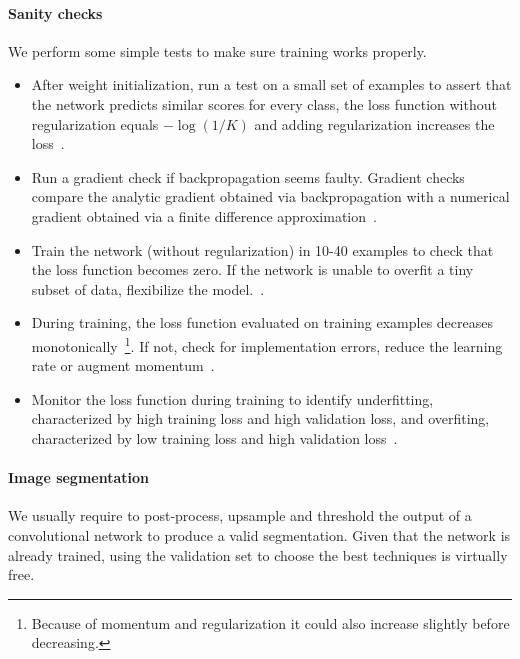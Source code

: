 \paragraph{Sanity checks}
We perform some simple tests to make sure training works properly.
\begin{itemize}
	\item After weight initialization, run a test on a small set of examples to assert that the network predicts similar scores for every class, the loss function without regularization equals $-\log(1/K)$ and adding regularization increases the loss~\cite{Karpathy2015}.

	\item Run a gradient check if backpropagation seems faulty. Gradient checks compare the analytic gradient obtained via backpropagation with a numerical gradient obtained via a finite difference approximation~\cite{Karpathy2015}.

	\item Train the network (without regularization) in 10-40 examples to check that the loss function becomes zero. If the network is unable to overfit a tiny subset of data, flexibilize the model.~\cite{Ng2014}.

	\item During training, the loss function evaluated on training examples decreases monotonically~\footnote{Because of momentum and regularization it could also increase slightly before decreasing.}. If not, check for implementation errors, reduce the learning rate or augment momentum~\cite{Karpathy2015}.

	\item Monitor the loss function during training to identify underfitting, characterized by high training loss and high validation loss, and overfiting, characterized by low training loss and high validation loss~\cite{Ng2014}.
\end{itemize}

\paragraph{Image segmentation} We usually require to post-process, upsample and threshold the output of a convolutional network to produce a valid segmentation. 
Given that the network is already trained, using the validation set to choose the best techniques is virtually free.%

